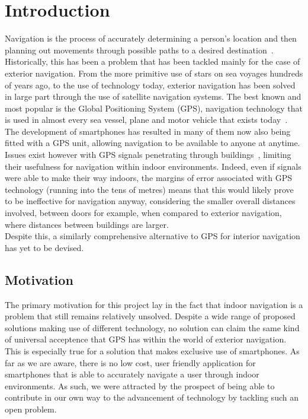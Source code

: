 \documentclass[main.tex]{subfiles}
\begin{document}
\chapter{Introduction}

Navigation is the process of accurately determining a person's location and then planning out movements through possible paths to a desired destination~\cite{navMeaning}. Historically, this has been a problem that has been tackled mainly for the case of exterior navigation. From the more primitive use of stars on sea voyages hundreds of years ago, to the use of technology today, exterior navigation has been solved in large part through the use of satellite navigation systems. The best known and most popular is the Global Positioning System (GPS), navigation technology that is used in almost every sea vessel, plane and motor vehicle that exists today~\cite{gps}.\\

The development of smartphones has resulted in many of them now also being fitted with a GPS unit, allowing navigation to be available to anyone at anytime. Issues exist however with GPS signals penetrating through buildings~\cite{gps}, limiting their usefulness for navigation within indoor environments. Indeed, even if signals were able to make their way indoors, the margins of error associated with GPS technology (running into the tens of metres) means that this would likely prove to be ineffective for navigation anyway, considering the smaller overall distances involved, between doors for example, when compared to exterior navigation, where distances between buildings are larger.\\

Despite this, a similarly comprehensive alternative to GPS for interior navigation has yet to be devised.

\section{Motivation}

The primary motivation for this project lay in the fact that indoor navigation is a problem that still remains relatively unsolved. Despite a wide range of proposed solutions making use of different technology, no solution can claim the same kind of universal acceptence that GPS has within the world of exterior navigation. This is especially true for a solution that makes exclusive use of smartphones. As far as we are aware, there is no low cost, user friendly application for smartphones that is able to accurately navigate a user through indoor environments. As such, we were attracted by the prospect of being able to contribute in our own way to the advancement of technology by tackling such an open problem.\\
\end{document}

